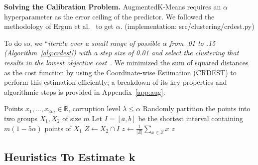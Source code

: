 \noindent \textbf{Solving the Calibration Problem.} AugmentedK-Means requires an $\alpha$ hyperparameter as the error ceiling of the predictor. We followed the methodology of Ergun et al.~\cite{ergun2022_learningaugmentedkmeansclustering} to get $\alpha$. 
(implementation:  src/clustering/crdest.py)

To do so, we ``\textit{iterate over a small range of possible $\alpha$ from .01 to .15 (Algorithm~\ref{alg:crdest}) with a step size of 0.01 and select the clustering that results in the lowest objective cost}~\cite{ergun2022_learningaugmentedkmeansclustering}. We minimized the sum of squared distances as the cost function by using the Coordinate-wise Estimation (CRDEST) to perform this estimation efficiently; a breakdown of its key properties and algorithmic steps is provided in Appendix~\ref{app:aug}.

\begin{algorithm}[H]
\caption{Coordinate-wise estimation (CRDEST)}
\label{alg:crdest}
\begin{algorithmic}[1]
\Require Points $x_1, \ldots, x_{2m} \in \mathbb{R}$, corruption level $\lambda \leq \alpha$
    \State Randomly partition the points into two groups $X_1, X_2$ of size $m$
    \State Let $I = [a, b]$ be the shortest interval containing $m(1 - 5\alpha)$ points of $X_1$
    \State $Z \gets X_2 \cap I$
    \State $z \gets \tfrac{1}{|Z|}\sum_{x \in Z} x$
    \State \Return $z$
\EndFor
\end{algorithmic}
\end{algorithm}




\subsection{Heuristics To Estimate k}


